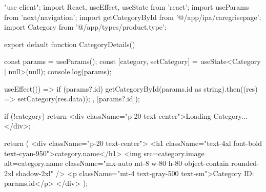 "use client";
import React, { useEffect, useState } from 'react';
import { useParams } from 'next/navigation';
import { getCategoryById } from '@/app/ipa/caregrisepage';
import { Category } from '@/app/types/product.type';


export default function CategoryDetails() {
  const params = useParams();
  const [category, setCategory] = useState<Category | null>(null);
  console.log(params);


  useEffect(() => {
    if (params?.id) {
      getCategoryById(params.id as string).then((res) => setCategory(res.data));
    }
  }, [params?.id]);

  if (!category) return <div className="p-20 text-center">Loading Category...</div>;

  return (
    <div className="p-20 text-center">
      <h1 className="text-4xl font-bold text-cyan-950">{category.name}</h1>
      <img
        src={category.image}
        alt={category.name}
        className="mx-auto mt-8 w-80 h-80 object-contain rounded-2xl shadow-2xl"
      />
      <p className="mt-4 text-gray-500 text-sm">Category ID: {params.id}</p>
    </div>
  );
}